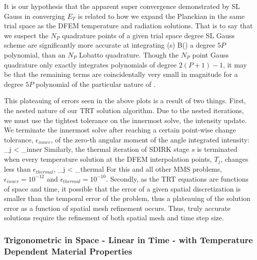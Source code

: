It is our hypothesis that the apparent super convergence demonstrated by SL Gauss in converging $E_T$ is related to how we expand the Planckian in the same trial space as the DFEM temperature and radiation solutions. 
That is to say that we suspect the $N_P$ quadrature points of a given trial space degree SL Gauss scheme are significantly more accurate at integrating 
\benum
{}(s) B() \pec
\label{eq:planck_int}
\eenum
a degree $5P$ polynomial, than an $N_P$ Lobatto quadrature.
Though the $N_P$ point Gauss quadrature only exactly integrates polynomials of degree $2(P+1) -1$, it may be that the remaining terms are coincidentally very small in magnitude for a degree $5P$ polynomial of the particular nature of .

This plateauing of errors seen in the above plots is a result of two things.  
First, the nested nature of our TRT solution algorithm.
Due to the nested iterations, we must use the tightest tolerance on the innermost solve, the intensity update.
We terminate the innermost solve after reaching a certain point-wise change tolerance, $\epsilon_{inner}$, of the zero-th angular moment of the angle integrated intensity: 
\benum
\max_{j} {   } < \epsilon_{inner} \pep
\eenum
Similarly, the thermal iteration of SDIRK stage $s$ is terminated when every temperature solution at the DFEM interpolation points, $T_j$,  changes less than $\epsilon_{thermal}$,
\benum
 \max_{j} { {   } }< \epsilon_{thermal} \pep
\eenum
For this and all other MMS problems, $\epsilon_{inner} = 10^{-12}$ and $\epsilon_{thermal} = 10^{-10}$.
Secondly, as the TRT equations are functions of space and time, it possible that the error of a given spatial discretization is smaller than the temporal error of the problem, thus a plateauing of the solution error as a function of spatial mesh refinement occurs.
Thus, truly accurate solutions require the refinement of both spatial mesh and time step size.

\subsubsection{Trigonometric in  Space - Linear in Time - with Temperature Dependent Material Properties}

